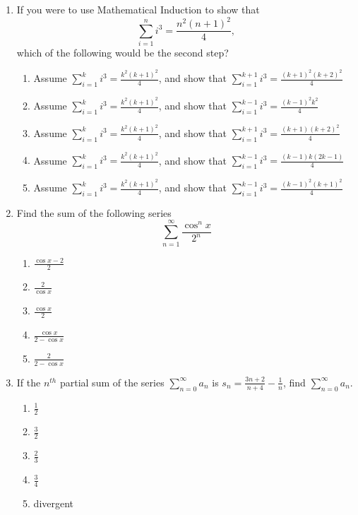 \documentclass[a4paper,12pt]{article}
\begin{document}
\begin{enumerate}
    \item If you were to use Mathematical Induction to show that
        $$\sum_{i=1}^{n} i^3 = \frac{n^2(n+1)^2}{4},$$
        which of the following would be the second step?
        \begin{enumerate}
            \item Assume $\sum_{i=1}^{k} i^3 = \frac{k^2(k+1)^2}{4}$, and show that $\sum_{i=1}^{k+1} i^3 = \frac{(k+1)^2(k+2)^2}{4}$
            \item Assume $\sum_{i=1}^{k} i^3 = \frac{k^2(k+1)^2}{4}$, and show that $\sum_{i=1}^{k-1} i^3 = \frac{(k-1)^2k^2}{4}$
            \item Assume $\sum_{i=1}^{k} i^3 = \frac{k^2(k+1)^2}{4}$, and show that $\sum_{i=1}^{k+1} i^3 = \frac{(k+1)(k+2)^2}{4}$
            \item Assume $\sum_{i=1}^{k} i^3 = \frac{k^2(k+1)^2}{4}$, and show that $\sum_{i=1}^{k-1} i^3 = \frac{(k-1)k(2k-1)}{4}$
            \item Assume $\sum_{i=1}^{k} i^3 = \frac{k^2(k+1)^2}{4}$, and show that $\sum_{i=1}^{k-1} i^3 = \frac{(k-1)^2(k+1)^2}{4}$
         \end{enumerate}
    \item Find the sum of the following series
    $$\sum_{n=1}^{\infty} \frac{\cos^n x}{2^n}$$
         \begin{enumerate}
            \item $\frac{\cos x - 2}{2}$
            \item $\frac{2}{\cos x}$
            \item $\frac{\cos x}{2}$
            \item $\frac{\cos x}{2 - \cos x}$
            \item $\frac{2}{2-\cos x}$
         \end{enumerate}
    \item  If the $n^{th}$ partial sum of the series $\sum_{n=0}^{\infty} a_n$ is $s_n = \frac{3n+2}{n+4} - \frac{1}{n}$, find $\sum_{n=0}^{\infty} a_n$.
         \begin{enumerate}
            \item $\frac{1}{2}$
            \item $\frac{3}{2}$
            \item $\frac{2}{3}$
            \item $\frac{3}{4}$
            \item divergent
         \end{enumerate}

\end{enumerate}
\end{document}
